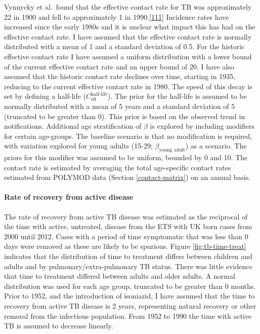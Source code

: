 \documentclass[11pt,twoside]{bristolthesis}
\begin{document}
  Vynnycky et al.~found that the effective contact rate for TB was approximately 22 in 1900 and fell to approximately 1 in 1990.{[}\protect\hyperlink{ref-Vynnycky1999}{111}{]} Incidence rates have increased since the early 1980s and it is unclear what impact this has had on the effective contact rate. I have assumed that the effective contact rate is normally distributed with a mean of 1 and a standard deviation of 0.5. For the historic effective contact rate I have assumed a uniform distribution with a lower bound of the current effective contact rate and an upper bound of 20. I have also assumed that the historic contact rate declines over time, starting in 1935, reducing to the current effective contact rate in 1980. The speed of this decay is set by defining a half-life (\(C^{\text{half-life}}_{\text{eff}}\)). The prior for the half-life is assumed to be normally distributed with a mean of 5 years and a standard deviation of 5 (truncated to be greater than 0). This prior is based on the observed trend in notifications. Additional age stratification of \(\beta\) is explored by including modifiers for certain age-groups. The baseline scenario is that no modification is required, with variation explored for young adults (15-29; \(\beta_{\text{young adult}}\)) as a scenario. The priors for this modifier was assumed to be uniform, bounded by 0 and 10. The contact rate is estimated by averaging the total age-specific contact rates estimated from POLYMOD data (Section \ref{contact-matrix}) on an annual basis.
  
  \hypertarget{rate-of-recovery-from-active-disease}{%
  \paragraph{Rate of recovery from active disease}\label{rate-of-recovery-from-active-disease}}
  
  The rate of recovery from active TB disease was estimated as the reciprocal of the time with active, untreated, disease from the ETS with UK born cases from 2000 until 2012. Cases with a period of time symptomatic that was less than 0 days were removed as these are likely to be spurious. Figure \ref{fig:tb-time-treat} indicates that the distribution of time to treatment differs between children and adults and by pulmonary/extra-pulmonary TB status. There was little evidence that time to treatment differed between adults and older adults. A normal distribution was used for each age group, truncated to be greater than 0 months. Prior to 1952, and the introduction of isoniazid, I have assumed that the time to recovery from active TB disease is 2 years, representing natural recovery or other removal from the infectious population. From 1952 to 1990 the time with active TB is assumed to decrease linearly.
  
\end{document}
